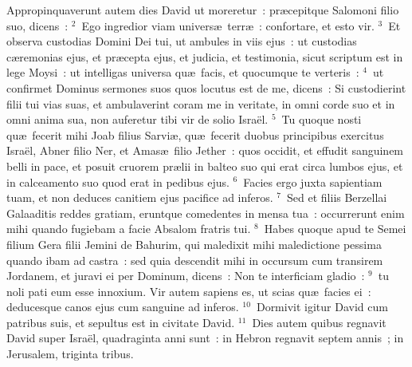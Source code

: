 \lettrine[lines=10,image=true,loversize=0.05,lraise=-0.03]{A}{}ppropinquaverunt autem dies David ut moreretur~: pr\ae cepitque Salomoni filio suo, dicens~:
${}^{2}$~Ego ingredior viam univers\ae\ terr\ae~: confortare, et esto vir.
${}^{3}$~Et observa custodias Domini Dei tui, ut ambules in viis ejus~: ut custodias c\ae remonias ejus, et pr\ae cepta ejus, et judicia, et testimonia, sicut scriptum est in lege Moysi~: ut intelligas universa qu\ae\ facis, et quocumque te verteris~:
${}^{4}$~ut confirmet Dominus sermones suos quos locutus est de me, dicens~: Si custodierint filii tui vias suas, et ambulaverint coram me in veritate, in omni corde suo et in omni anima sua, non auferetur tibi vir de solio Isra\"el.
${}^{5}$~Tu quoque nosti qu\ae\ fecerit mihi Joab filius Sarvi\ae , qu\ae\ fecerit duobus principibus exercitus Isra\"el, Abner filio Ner, et Amas\ae\ filio Jether~: quos occidit, et effudit sanguinem belli in pace, et posuit cruorem pr\ae lii in balteo suo qui erat circa lumbos ejus, et in calceamento suo quod erat in pedibus ejus.
${}^{6}$~Facies ergo juxta sapientiam tuam, et non deduces canitiem ejus pacifice ad inferos.
${}^{7}$~Sed et filiis Berzellai Galaaditis reddes gratiam, eruntque comedentes in mensa tua~: occurrerunt enim mihi quando fugiebam a facie Absalom fratris tui.
${}^{8}$~Habes quoque apud te Semei filium Gera filii Jemini de Bahurim, qui maledixit mihi maledictione pessima quando ibam ad castra~: sed quia descendit mihi in occursum cum transirem Jordanem, et juravi ei per Dominum, dicens~: Non te interficiam gladio~:
${}^{9}$~tu noli pati eum esse innoxium. Vir autem sapiens es, ut scias qu\ae\ facies ei~: deducesque canos ejus cum sanguine ad inferos.
${}^{10}$~Dormivit igitur David cum patribus suis, et sepultus est in civitate David.
${}^{11}$~Dies autem quibus regnavit David super Isra\"el, quadraginta anni sunt~: in Hebron regnavit septem annis~; in Jerusalem, triginta tribus.


